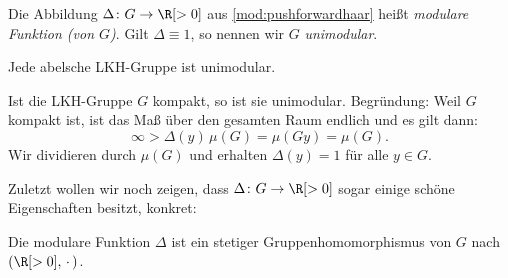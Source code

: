 \begin{thDef}
    Die Abbildung $\Delta\colon G\to\R[>0]$ aus \cref{mod:pushforwardhaar}
    heißt \emph{modulare Funktion (von $G$)}.
    Gilt $\Delta \equiv 1$, so nennen wir $G$ \emph{unimodular}.
\end{thDef}

\begin{BspList}[\label{mod:unimodbsp}]
\item
    Jede abelsche LKH-Gruppe ist unimodular.
    
\item\label{mod:unimodbsp:kompakt}
    Ist die LKH-Gruppe $G$ kompakt, so ist sie unimodular. Begründung: Weil $G$
    kompakt ist, ist das Maß über den gesamten Raum endlich und es gilt dann: 
    \[ \infty > \Delta(y)\,\mu(G) = \mu(Gy) = \mu(G) . \]
    Wir dividieren durch $\mu(G)$ und erhalten $\Delta(y)=1$ für alle $y\in G$.
\end{BspList}

Zuletzt wollen wir noch zeigen, dass $\Delta\colon G \to \R[>0]$ sogar einige
schöne Eigenschaften besitzt, konkret:

\begin{thSatz}
    Die modulare Funktion $\Delta$ ist ein stetiger Gruppenhomomorphismus
    von $G$ nach $(\R[>0],\,\cdot\,)$.
\end{thSatz}

